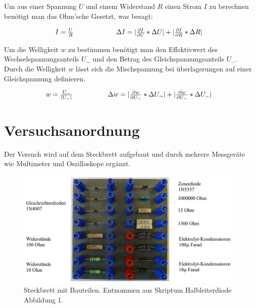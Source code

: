 \documentclass[12pt,a4paper,twoside]{article}
\begin{document}
\noindent
Um aus einer Spannung $U$ und einem Widerstand $R$ einen Strom $I$ zu berechnen benötigt man das Ohm'sche Gesetzt, was besagt: 

\begin{equation}
    \label{eq:ohmsche}
    \centerline{$I=\frac{U}{R}$ \\ $\Delta I = \vert \frac{\partial I}{\partial U} * \Delta U \vert + \vert \frac{\partial I}{\partial R} * \Delta R \vert $}
\end{equation}

%

\noindent
Um die Welligkeit $w$ zu bestimmen benötigt man den Effektivwert des Wechselspannungsanteils $U_\sim$ und den Betrag des Gleichspannungsanteils $U_-$. 
Durch die Welligkeit $w$ lässt sich die Mischspannung bei überlagerungen auf einer Gleichspannung definieren. 

\begin{equation}
    \label{eq:welligkeit}
    \centerline{$w = \frac{U_\sim }{\vert U_- \vert}$ \\ $\Delta w = \vert \frac{\partial w}{\partial U_\sim} * \Delta U_\sim \vert + \vert \frac{\partial w}{\partial U_-} * \Delta U_- \vert $}
\end{equation}

\section{Versuchsanordnung} %
Der Versuch wird auf dem Steckbrett aufgebaut und durch mehrere Messgeräte wie Multimeter und Oszilloskope ergänzt. 

\begin{figure}[H]
    \centering
    \includegraphics[width=0.6\linewidth]{nudes/steckbrett.jpg}
    \caption{Steckbrett mit Bauteilen. Entnommen aus Skriptum Halbleiterdiode Abbildung 1. \cite{teachcenter2}}
    \label{fig:Steckbrett}
\end{figure}
\end{document}
